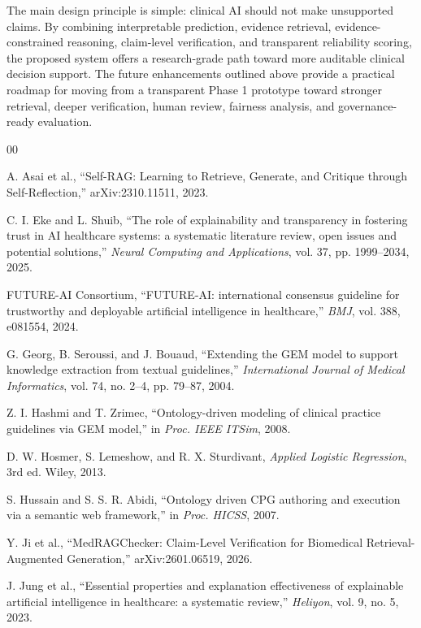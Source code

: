 \documentclass[conference]{IEEEtran}
\begin{document}
The main design principle is simple: clinical AI should not make unsupported claims. By combining interpretable prediction, evidence retrieval, evidence-constrained reasoning, claim-level verification, and transparent reliability scoring, the proposed system offers a research-grade path toward more auditable clinical decision support. The future enhancements outlined above provide a practical roadmap for moving from a transparent Phase 1 prototype toward stronger retrieval, deeper verification, human review, fairness analysis, and governance-ready evaluation.

\balance
\begin{thebibliography}{00}

 A. Asai et al., ``Self-RAG: Learning to Retrieve, Generate, and Critique through Self-Reflection,'' arXiv:2310.11511, 2023.

 C. I. Eke and L. Shuib, ``The role of explainability and transparency in fostering trust in AI healthcare systems: a systematic literature review, open issues and potential solutions,'' \textit{Neural Computing and Applications}, vol. 37, pp. 1999--2034, 2025.

 FUTURE-AI Consortium, ``FUTURE-AI: international consensus guideline for trustworthy and deployable artificial intelligence in healthcare,'' \textit{BMJ}, vol. 388, e081554, 2024.

 G. Georg, B. Seroussi, and J. Bouaud, ``Extending the GEM model to support knowledge extraction from textual guidelines,'' \textit{International Journal of Medical Informatics}, vol. 74, no. 2--4, pp. 79--87, 2004.

 Z. I. Hashmi and T. Zrimec, ``Ontology-driven modeling of clinical practice guidelines via GEM model,'' in \textit{Proc. IEEE ITSim}, 2008.

 D. W. Hosmer, S. Lemeshow, and R. X. Sturdivant, \textit{Applied Logistic Regression}, 3rd ed. Wiley, 2013.

 S. Hussain and S. S. R. Abidi, ``Ontology driven CPG authoring and execution via a semantic web framework,'' in \textit{Proc. HICSS}, 2007.

 Y. Ji et al., ``MedRAGChecker: Claim-Level Verification for Biomedical Retrieval-Augmented Generation,'' arXiv:2601.06519, 2026.

 J. Jung et al., ``Essential properties and explanation effectiveness of explainable artificial intelligence in healthcare: a systematic review,'' \textit{Heliyon}, vol. 9, no. 5, 2023.


\end{thebibliography}
\end{document}
